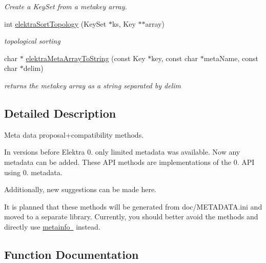 \begin{DoxyCompactItemize}
\begin{DoxyCompactList}\small\item\em Create a {\ttfamily Key\+Set} from a metakey array. \end{DoxyCompactList}\item 
int \mbox{\hyperlink{group__meta_gaadfae80314be2415a7654fe8a0d2ee82}{elektra\+Sort\+Topology}} (Key\+Set $\ast$ks, Key $\ast$$\ast$array)
\begin{DoxyCompactList}\small\item\em topological sorting \end{DoxyCompactList}\item 
char $\ast$ \mbox{\hyperlink{group__meta_ga40469799e2c6e9937eaf013bfc05d014}{elektra\+Meta\+Array\+To\+String}} (const Key $\ast$key, const char $\ast$meta\+Name, const char $\ast$delim)
\begin{DoxyCompactList}\small\item\em returns the metakey array as a string separated by delim \end{DoxyCompactList}\end{DoxyCompactItemize}


\subsection{Detailed Description}
Meta data proposal+compatibility methods. 

In versions before Elektra 0. only limited metadata was available. Now any metadata can be added. These A\+PI methods are implementations of the 0. A\+PI using 0. metadata.

Additionally, new suggestions can be made here.

It is planned that these methods will be generated from doc/\+M\+E\+T\+A\+D\+A\+T\+A.\+ini and moved to a separate library. Currently, you should better avoid the methods and directly use \mbox{\hyperlink{group__keymeta}{metainfo }} instead. 

\subsection{Function Documentation}
\mbox{\label{group__meta_gab8b30dfabb0867bd6899e60e7bd193a2}} 
